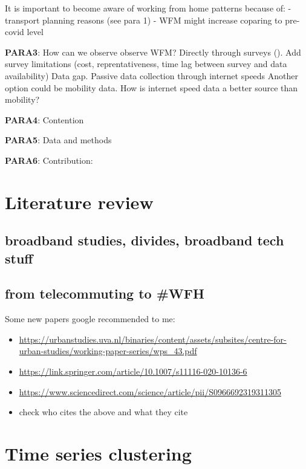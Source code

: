 \documentclass[]{interact}
\theoremstyle{plain}%
\theoremstyle{definition}
\theoremstyle{remark}
\def\tightlist{}
\begin{document}
It is important to become aware of working from home patterns because
of: - transport planning reasons (see para 1) - WFM might increase
coparing to pre-covid level

\textbf{PARA3}: How can we observe observe WFM? Directly through surveys
(\citet{felstead2020homeworking}). Add survey limitations (cost,
reprentativeness, time lag between survey and data availability) Data
gap. Passive data collection through internet speeds Another option
could be mobility data. How is internet speed data a better source than
mobility?

\textbf{PARA4}: Contention

\textbf{PARA5}: Data and methods

\textbf{PARA6}: Contribution:

\hypertarget{literature-review}{%
\section{Literature review}\label{literature-review}}

\hypertarget{broadband-studies-divides-broadband-tech-stuff}{%
\subsection{broadband studies, divides, broadband tech
stuff}\label{broadband-studies-divides-broadband-tech-stuff}}

\hypertarget{from-telecommuting-to-wfh}{%
\subsection{from telecommuting to
\#WFH}\label{from-telecommuting-to-wfh}}

Some new papers google recommended to me:

\begin{itemize}
\tightlist
\item
  \url{https://urbanstudies.uva.nl/binaries/content/assets/subsites/centre-for-urban-studies/working-paper-series/wps_43.pdf}
\item
  \url{https://link.springer.com/article/10.1007/s11116-020-10136-6}
\item
  \url{https://www.sciencedirect.com/science/article/pii/S0966692319311305}
\item
  check who cites the above and what they cite
\end{itemize}

\hypertarget{time-series-clustering}{%
\section{Time series clustering}\label{time-series-clustering}}
\end{document}
